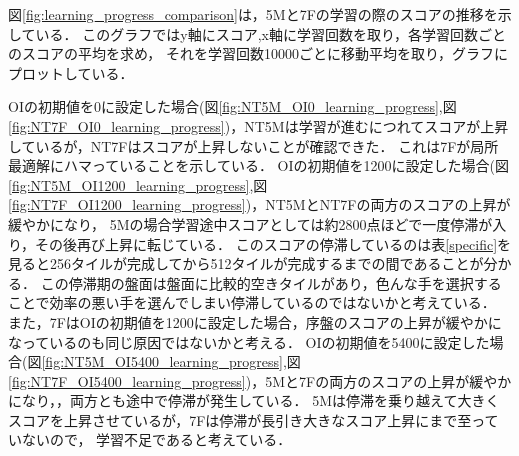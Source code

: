 図\ref{fig:learning_progress_comparison}は，5Mと7Fの学習の際のスコアの推移を示している．
このグラフではy軸にスコア,x軸に学習回数を取り，各学習回数ごとのスコアの平均を求め，
それを学習回数10000ごとに移動平均を取り，グラフにプロットしている．

OIの初期値を0に設定した場合(図\ref{fig:NT5M_OI0_learning_progress},図\ref{fig:NT7F_OI0_learning_progress})，NT5Mは学習が進むにつれてスコアが上昇しているが，NT7Fはスコアが上昇しないことが確認できた．
これは7Fが局所最適解にハマっていることを示している．
OIの初期値を1200に設定した場合(図\ref{fig:NT5M_OI1200_learning_progress},図\ref{fig:NT7F_OI1200_learning_progress})，NT5MとNT7Fの両方のスコアの上昇が緩やかになり，
5Mの場合学習途中スコアとしては約2800点ほどで一度停滞が入り，その後再び上昇に転じている．
このスコアの停滞しているのは表\ref{specific}を見ると256タイルが完成してから512タイルが完成するまでの間であることが分かる．
この停滞期の盤面は盤面に比較的空きタイルがあり，色んな手を選択することで効率の悪い手を選んでしまい停滞しているのではないかと考えている．
また，7FはOIの初期値を1200に設定した場合，序盤のスコアの上昇が緩やかになっているのも同じ原因ではないかと考える．
OIの初期値を5400に設定した場合(図\ref{fig:NT5M_OI5400_learning_progress},図\ref{fig:NT7F_OI5400_learning_progress})，5Mと7Fの両方のスコアの上昇が緩やかになり，，両方とも途中で停滞が発生している．
5Mは停滞を乗り越えて大きくスコアを上昇させているが，7Fは停滞が長引き大きなスコア上昇にまで至っていないので，
学習不足であると考えている．

